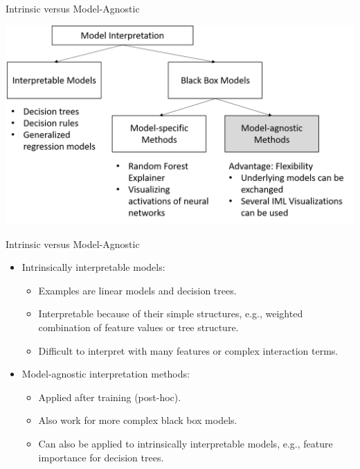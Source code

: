 \documentclass[11pt,compress,t,notes=noshow, xcolor=table]{beamer}
\begin{document}
\begin{vbframe}{Intrinsic versus Model-Agnostic}
	\begin{center}
		\includegraphics[width=\textwidth]{figure/overview}
	\end{center}
\end{vbframe}


\begin{vbframe}{Intrinsic versus Model-Agnostic}
	\begin{itemize}
		\item Intrinsically interpretable models:
		\begin{itemize}
			\item Examples are linear models and decision trees.
			\item Interpretable because of their simple structures, e.g., weighted combination of feature values or tree structure. 
			\item Difficult to interpret with many features or complex interaction terms.
		\end{itemize}
	\bigskip
	
		\item Model-agnostic interpretation methods:
		\begin{itemize}
			\item Applied after training (post-hoc).
			\item Also work for more complex black box models.
			\item Can also be applied to intrinsically interpretable models, e.g., feature importance for decision trees. 
		\end{itemize}
	\end{itemize}
\end{vbframe}
\end{document}
